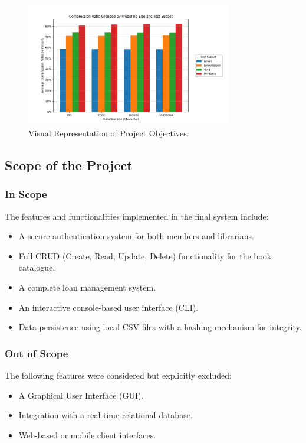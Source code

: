 \begin{figure}[H]
    \centering
    \includegraphics[width=0.8\textwidth]{figures/project_goals.png}
    \caption{Visual Representation of Project Objectives.}
    \label{fig:project_goals}
\end{figure}


\subsection{Scope of the Project}
\subsubsection{In Scope}
The features and functionalities implemented in the final system include:
\begin{itemize}
    \item A secure authentication system for both members and librarians.
    \item Full CRUD (Create, Read, Update, Delete) functionality for the book catalogue.
    \item A complete loan management system.
    \item An interactive console-based user interface (CLI).
    \item Data persistence using local CSV files with a hashing mechanism for integrity.
\end{itemize}

\subsubsection{Out of Scope}
The following features were considered but explicitly excluded:
\begin{itemize}
    \item A Graphical User Interface (GUI).
    \item Integration with a real-time relational database.
    \item Web-based or mobile client interfaces.
\end{itemize}


